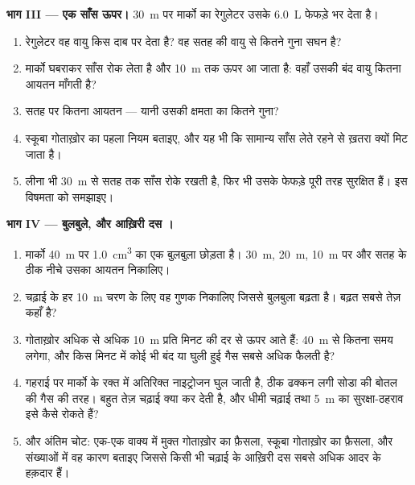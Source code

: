 \begin{problem}
\medskip
\noindent\textbf{भाग III --- एक साँस ऊपर।}
\qty{30}{m} पर मार्को का रेगुलेटर उसके \qty{6.0}{L} फेफड़े भर देता है।
\begin{enumerate}[resume]
  \item रेगुलेटर वह वायु किस दाब पर देता है? वह सतह की वायु से
        कितने गुना सघन है?
  \item मार्को घबराकर साँस रोक लेता है और \qty{10}{m} तक ऊपर आ जाता है:
        वहाँ उसकी बंद वायु कितना आयतन माँगती है?
  \item सतह पर कितना आयतन --- यानी उसकी क्षमता का कितने गुना?
  \item स्कूबा गोताख़ोर का पहला नियम बताइए, और यह भी कि सामान्य साँस
        लेते रहने से ख़तरा क्यों मिट जाता है।
  \item लीना भी \qty{30}{m} से सतह तक साँस रोके रखती है, फिर भी उसके फेफड़े
        पूरी तरह सुरक्षित हैं। इस विषमता को समझाइए।
\end{enumerate}

\medskip
\noindent\textbf{भाग IV --- बुलबुले, और आख़िरी दस ।}
\begin{enumerate}[resume]
  \item मार्को \qty{40}{m} पर \qty{1.0}{cm^3} का एक बुलबुला छोड़ता है। \qty{30}{m},
        \qty{20}{m}, \qty{10}{m} पर और सतह के ठीक नीचे उसका आयतन निकालिए।
  \item चढ़ाई के हर \qty{10}{m} चरण के लिए वह गुणक निकालिए जिससे बुलबुला
        बढ़ता है। बढ़त सबसे तेज़ कहाँ है?
  \item गोताख़ोर अधिक से अधिक \qty{10}{m} प्रति मिनट की दर से ऊपर आते हैं:
        \qty{40}{m} से कितना समय लगेगा, और किस मिनट में कोई भी बंद या घुली
        हुई गैस सबसे अधिक फैलती है?
  \item गहराई पर मार्को के रक्त में अतिरिक्त नाइट्रोजन घुल जाती है, ठीक
        ढक्कन लगी सोडा की बोतल की गैस की तरह। बहुत तेज़ चढ़ाई क्या कर
        देती है, और धीमी चढ़ाई तथा \qty{5}{m} का सुरक्षा-ठहराव इसे कैसे
        रोकते हैं?
  \item और अंतिम चोट: एक-एक वाक्य में मुक्त गोताख़ोर का फ़ैसला, स्कूबा
        गोताख़ोर का फ़ैसला, और संख्याओं में वह कारण बताइए जिससे किसी भी
        चढ़ाई के आख़िरी दस  सबसे अधिक आदर के हक़दार हैं।
\end{enumerate}
\end{problem}
